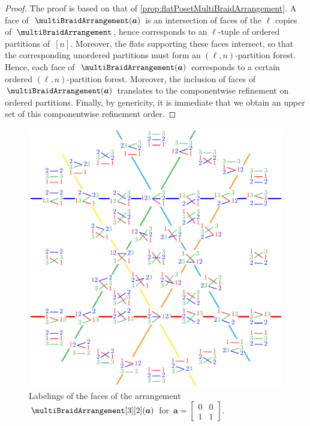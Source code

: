 \documentclass{amsart}
\theoremstyle{definition}
\renewcommand{\b}[1]{{\boldsymbol{#1}}} %
\renewcommand{\b}[1]{\boldsymbol{#1}} %
\begin{document}
\begin{proof}
The proof is based on that of \cref{prop:flatPosetMultiBraidArrangement}.
A face of~$\multiBraidArrangement(\b{a})$ is an intersection of faces of the $\ell$ copies of~$\multiBraidArrangement$, hence corresponds to an $\ell$-tuple of ordered partitions of~$[n]$.
Moreover, the flats supporting these faces intersect, so that the corresponding unordered partitions must form an $(\ell,n)$-partition forest.
Hence, each face of~$\multiBraidArrangement(\b{a})$ corresponds to a certain ordered $(\ell,n)$-partition forest.
Moreover, the inclusion of faces of~$\multiBraidArrangement(\b{a})$ translates to the componentwise refinement on ordered partitions.
Finally, by genericity, it is immediate that we obtain an upper set of this componentwise refinement order.
\end{proof}

\begin{figure}
	\includegraphics[scale=.9]{B23a}
	\caption{Labelings of the faces of the arrangement~$\multiBraidArrangement[3][2](\b{a})$ for~$\b{a} = \begin{bmatrix} 0 & 0 \\ 1 & 1 \end{bmatrix}$.}
	\label{fig:B23a}
\end{figure}
\end{document}
